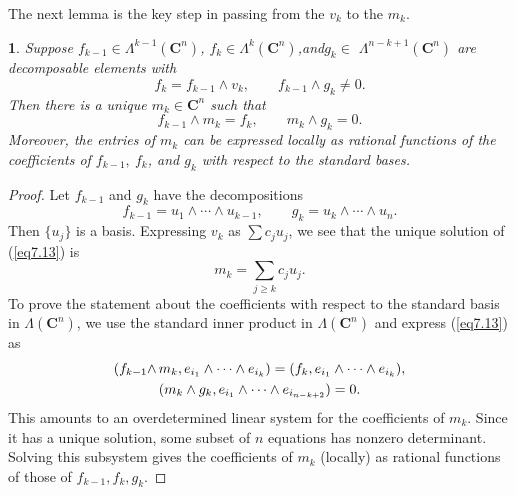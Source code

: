 \documentclass{surv-l}
\theoremstyle{plain}
\newtheorem{lemma}[theorem]{\sc{Lemma}}
\theoremstyle{definition}
\numberwithin{equation}{chapter}
\begin{document}
The next lemma is the key step in passing from the $v_{k}$ to the $m_{k}$.
\setcounter{theorem}{10}
\begin{lemma}\label{chap01:lem7.11}
Suppose $f_{k-1} \in\Lambda^{k-1}(\mathbf{C}^{n})$, $f_{k} \in\Lambda^{k}(\mathbf{C}^{n})$,\quad and\quad $g_{k} \in$ $\Lambda^{n-k+1}(\mathbf{C}^{n})$ are decomposable elements with
\setcounter{equation}{11}
\begin{equation}\label{eq7.12}
f_{k}=f_{k-1}\wedge v_{k},\qquad f_{k-1}\wedge g_{k}\neq 0.
\end{equation}
Then there is a unique $m_{k}\in \mathbf{C}^{n}$ such that
\begin{equation}\label{eq7.13}
f_{k-1}\wedge m_{k}=f_{k},\qquad m_{k}\wedge g_{k}=0.
\end{equation}
Moreover, the entries of $m_{k}$ can be expressed locally as rational functions of the coefficients of $f_{k-1},\ f_{k}$, and $g_{k}$ with respect to the standard bases.
\end{lemma}
\begin{proof}
Let $f_{k-1}$ and $g_{k}$ have the decompositions
\begin{equation*}
 f_{k-1}=u_{1}\wedge\cdots\wedge u_{k-1},\qquad  g_{k}=u_{k}\wedge\cdots\wedge u_{n}.
\end{equation*}
Then $\{u_{j}\}$ is a basis. Expressing $v_{k}$ as $\sum c_{j}u_{j}$, we see that the unique solution of (\ref{eq7.13}) is
\begin{equation*}
m_{k}=\displaystyle\sum_{j\geq k}c_{j}u_{j}.
\end{equation*}
To prove the statement about the coefficients with respect to the standard basis in $\Lambda(\mathbf{C}^{n})$, we use the standard inner product in $\Lambda(\mathbf{C}^{n})$ and express (\ref{eq7.13}) as
\begin{align}\label{eq7.14}
(f_{k-1}\wedge\, &m_{k}, e_{i_{1}}\wedge\cdots\wedge e_{i_{k}})=(f_{k}, e_{i_{1}}\wedge\cdots\wedge e_{i_{k}}),\\
&(m_{k}\wedge g_{k}, e_{i_{1}}\wedge\cdots\wedge e_{i_{n-k+2}})=0.\notag
\end{align}
This amounts to an overdetermined linear system for the coefficients of $m_{k}$. Since it has a unique solution, some subset of $n$ equations has nonzero determinant. Solving this subsystem gives the coefficients of $m_{k}$ (locally) as rational functions of those of $f_{k-1}, f_{k}, g_{k}$.
\end{proof}
\setcounter{theorem}{14}
\end{document}
